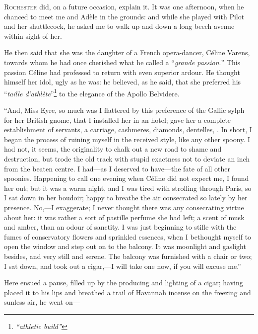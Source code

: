 
 \textsc{ Rochester} did, on a future occasion, explain it. It was one
afternoon, when he chanced to meet me and Adèle in the grounds: and
while she played with Pilot and her shuttlecock, he asked me to walk up
and down a long beech avenue within sight of her.

He then said that she was the daughter of a French opera-dancer, Céline
Varens, towards whom he had once cherished what he called a
\foreignquote{french}{\emph{grande passion}.} This passion Céline had professed to return
with even superior ardour. He thought himself her idol, ugly as he was:
he believed, as he said, that she preferred his \foreignquote{french}{\emph{taille
d'athlète}}\footnote{\emph{\enquote{athletic build}}} to the elegance of the Apollo Belvidere.

\enquote{And, Miss Eyre, so much was I flattered by this preference of
the Gallic sylph for her British gnome, that I installed her in an
hotel; gave her a complete establishment of servants, a carriage,
cashmeres, diamonds, dentelles, \etc. In short, I began the process of
ruining myself in the received style, like any other spoony. I had not,
it seems, the originality to chalk out a new road to shame and
destruction, but trode the old track with stupid exactness not to
deviate an inch from the beaten centre. I had---as I deserved to
have---the fate of all other spoonies. Happening to call one evening
when Céline did not expect me, I found her out; but it was a warm night,
and I was tired with strolling through Paris, so I sat down in her
boudoir; happy to breathe the air consecrated so lately by her
presence. No,---I exaggerate; I never thought there was any
consecrating virtue about her: it was rather a sort of pastille perfume
she had left; a scent of musk and amber, than an odour of sanctity. I
was just beginning to stifle with the fumes of conservatory flowers and
sprinkled essences, when I bethought myself to open the window and step
out on to the balcony. It was moonlight and gaslight besides, and very
still and serene. The balcony was furnished with a chair or two; I sat
down, and took out a cigar,---I will take one now, if you will excuse
me.}

Here ensued a pause, filled up by the producing and lighting of a cigar;
having placed it to his lips and breathed a trail of Havannah incense on
the freezing and sunless air, he went on---

